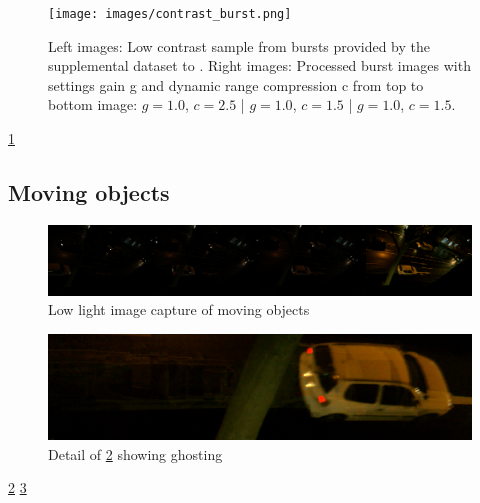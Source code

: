 \documentclass{egpubl}
\begin{document}
\begin{figure}
      \hspace{\fill}
      \texttt{[image: images/contrast\_burst.png]}
      \hspace{\fill}
      \centering
      \caption{
            Left images: Low contrast sample from bursts provided by the supplemental dataset
            to \cite{Hasinoff2016burst}.
            Right images: Processed burst images with settings gain g and dynamic 
            range compression c from top to bottom image: $g=1.0$, $c=2.5$ | $g=1.0$, $c=1.5$ | $g=1.0$, $c=1.5$.
      }
      \label{fig:contrast}
\end{figure}

\cref{fig:contrast}

\subsection{Moving objects}

\begin{figure}
      \hspace{\fill}
      \includegraphics[width=0.9\linewidth]{images/moving_burst.png}
      \hspace{\fill}
      \centering
      \caption{Low light image capture of moving objects}
      \label{fig:moving}
\end{figure}

\begin{figure}
      \hspace{\fill}
      \includegraphics[width=0.9\linewidth]{images/ghosting.png}
      \hspace{\fill}
      \centering
      \caption{Detail of \cref{fig:moving} showing ghosting }
      \label{fig:ghosting}
\end{figure}

\cref{fig:moving}
\cref{fig:ghosting}

\end{document}
